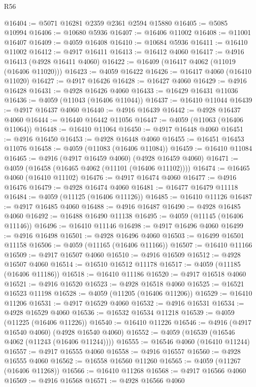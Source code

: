 \begin{lexlean}{R56}
\begin{coremodule}
@16404 := @5071 @16281 @2359 @2361 @2594 @15880
@16405 := @5085 @10994
@16406 := @10680 @5936
@16407 := @16406 @11002
@16408 := @11001 @16407
@16409 := @4059 @16408
@16410 := @10684 @5936
@16411 := @16410 @11002
@16412 := @4917 @16411
@16413 := @16412 @4060
@16417 := @4916 @16413 (@4928 @16411 @4060)
@16422 := @16409 (@16417 @4062 (@11019 (@16406 @11020)))
@16423 := @4059 @16422
@16426 := @16417 @4060 (@16410 @11020)
@16427 := @4917 @16426
@16428 := @16427 @4060
@16429 := @4916 @16428
@16431 := @4928 @16426 @4060
@16433 := @16429 @16431 @11036
@16436 := @4059 (@11043 (@16406 @11044))
@16437 := @16410 @11044
@16439 := @4917 @16437 @4060
@16440 := @4916 @16439
@16442 := @4928 @16437 @4060
@16444 := @16440 @16442 @11056
@16447 := @4059 (@11063 (@16406 @11064))
@16448 := @16410 @11064
@16450 := @4917 @16448 @4060
@16451 := @4916 @16450
@16453 := @4928 @16448 @4060
@16455 := @16451 @16453 @11076
@16458 := @4059 (@11083 (@16406 @11084))
@16459 := @16410 @11084
@16465 := @4916 (@4917 @16459 @4060) (@4928 @16459 @4060)
@16471 := @4059 (@16458 (@16465 @4062 (@11101 (@16406 @11102))))
@16474 := @16465 @4060 (@16410 @11102)
@16476 := @4917 @16474 @4060
@16477 := @4916 @16476
@16479 := @4928 @16474 @4060
@16481 := @16477 @16479 @11118
@16484 := @4059 (@11125 (@16406 @11126))
@16485 := @16410 @11126
@16487 := @4917 @16485 @4060
@16488 := @4916 @16487
@16490 := @4928 @16485 @4060
@16492 := @16488 @16490 @11138
@16495 := @4059 (@11145 (@16406 @11146))
@16496 := @16410 @11146
@16498 := @4917 @16496 @4060
@16499 := @4916 @16498
@16501 := @4928 @16496 @4060
@16503 := @16499 @16501 @11158
@16506 := @4059 (@11165 (@16406 @11166))
@16507 := @16410 @11166
@16509 := @4917 @16507 @4060
@16510 := @4916 @16509
@16512 := @4928 @16507 @4060
@16514 := @16510 @16512 @11178
@16517 := @4059 (@11185 (@16406 @11186))
@16518 := @16410 @11186
@16520 := @4917 @16518 @4060
@16521 := @4916 @16520
@16523 := @4928 @16518 @4060
@16525 := @16521 @16523 @11198
@16528 := @4059 (@11205 (@16406 @11206))
@16529 := @16410 @11206
@16531 := @4917 @16529 @4060
@16532 := @4916 @16531
@16534 := @4928 @16529 @4060
@16536 := @16532 @16534 @11218
@16539 := @4059 (@11225 (@16406 @11226))
@16540 := @16410 @11226
@16546 := @4916 (@4917 @16540 @4060) (@4928 @16540 @4060)
@16552 := @4059 (@16539 (@16546 @4062 (@11243 (@16406 @11244))))
@16555 := @16546 @4060 (@16410 @11244)
@16557 := @4917 @16555 @4060
@16558 := @4916 @16557
@16560 := @4928 @16555 @4060
@16562 := @16558 @16560 @11260
@16565 := @4059 (@11267 (@16406 @11268))
@16566 := @16410 @11268
@16568 := @4917 @16566 @4060
@16569 := @4916 @16568
@16571 := @4928 @16566 @4060

\end{coremodule}
\end{lexlean}
